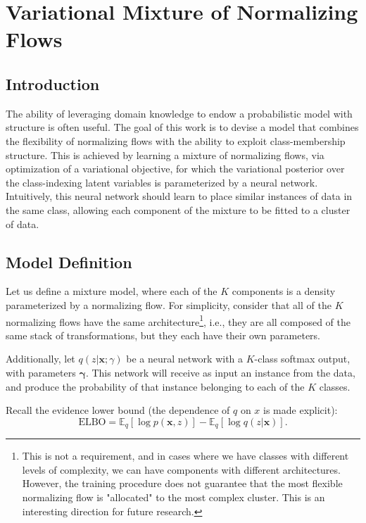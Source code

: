 \section{Variational Mixture of Normalizing Flows}
\label{section:vmonf}

\subsection{Introduction}
\label{subsection:vmonf-intro}

The ability of leveraging domain knowledge to endow a probabilistic model with
structure is often useful. The goal of this work is to devise a model that combines
the flexibility of normalizing flows with the ability to exploit class-membership
structure. This is achieved by learning a mixture of normalizing flows, via
optimization of a variational objective, for which the variational posterior
over the class-indexing latent variables is parameterized by a neural network.
Intuitively, this neural network should learn to place similar instances of
data in the same class, allowing each component of the mixture to be fitted
to a cluster of data.

\subsection{Model Definition}

Let us define a mixture model, where each of
the $K$ components is a density parameterized by a normalizing flow. For simplicity,
consider that all of the $K$ normalizing flows have the same
architecture\footnote{This is not a requirement,
and in cases where we have classes with different levels of complexity, we can
have components with different architectures. However, the training procedure
does not guarantee that the most flexible normalizing flow is "allocated"
to the most complex cluster. This is an interesting direction for future
research.}, i.e., they are all composed of the same stack of transformations,
but they each have their own parameters.

Additionally, let $q(z|\bm{x};\gamma)$ be a neural network with a $K$-class softmax
output, with parameters $\bm\gamma$. This network will receive as input an instance from the
data, and produce the probability of that instance belonging to each of the
$K$ classes.

Recall the evidence lower bound (the dependence of $q$ on $x$ is made explicit):
\begin{equation*}
    \text{ELBO} = \mathbb{E}_q [\log p(\bm{x}, z)] - \mathbb{E}_q [\log q(z|\bm{x})].
\end{equation*}

